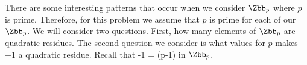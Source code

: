 \documentclass{article}
\def\prog#1{
\vspace{.1in}\begin{mdframed} \begin{center} \textbf{Programming Reminders} \end{center}#1 \end{mdframed} }
\begin{document}
	There are some interesting patterns that occur when we consider $\Zbb_p$ where $p$ is prime.  Therefore, for this problem we assume that $p$ is prime for each of our $\Zbb_p$.  We will consider two questions.  First, how many elements of $\Zbb_p$ are quadratic residues.  The second question we consider is what values for $p$ makes $-1$ a quadratic residue.  Recall that -1 = (p-1) in $\Zbb_p$.  
	
	
 
 	
 	
 	
 	
 	
 	
 	

	
	
	
	
	
	
	
	




\end{document}
